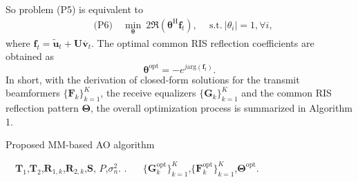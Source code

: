 \documentclass[journal]{IEEEtran}
\begin{document}
{ So problem (P5) is equivalent to 
 \begin{equation}\begin{aligned}& \text {(P6)}\quad \underset { \boldsymbol {\theta}}{\min }~ 2{\Re}(\boldsymbol {\theta}^{\mathrm{H}}{\mathbf {f}_{t}}),
     \quad ~\text {s.t.}~
     |\theta  _{i}|=1, 
    \forall{i},
     \end{aligned}\end{equation} 
    where ${\mathbf {f}_{t}}=\tilde{\mathbf {u}}_{t}+\mathbf {U}\overline{\mathbf {v}}_{t}$. The optimal common RIS reflection coefficients are obtained as 
    \begin{equation} \boldsymbol {\theta}^{\mathrm{ opt}}=-e^{ j\text {arg}(\mathbf {f}_{t})}.
\label{24}        \end{equation}
In short, with the derivation of closed-form solutions for the transmit beamformers $\{ {\mathbf{F}}_{k} \}_{k=1}^{K}$, the receive equalizers $\{ {\mathbf{G}}_{k} \}_{k=1}^{K}$ and
the common RIS reflection pattern $\boldsymbol {\Theta }$, the overall optimization process is summarized in Algorithm 1.

 \renewcommand{\algorithmicrequire}{ \textbf{Input:}} %
\renewcommand{\algorithmicensure}{ \textbf{Output :}} %


    \begin{algorithm}[htb]
    \caption{ Proposed MM-based AO algorithm}
    \label{alg:example}
    \begin{algorithmic}[1] %
    \REQUIRE ~~$\mathbf {T}_{1}$,$\mathbf {T}_{2}$,$\mathbf {R}_{1,k}$,$\mathbf {R}_{2,k}$,$\mathbf {S}$, $P$,$\sigma _{n}^{2}$.%
    .   %
    \REPEAT 
    \ENSURE ~~ $\lbrace{\boldsymbol {G} }_{k}^{\mathrm{ opt}}\rbrace_{k=1}^{K}$,$\lbrace{\boldsymbol {F} }_{k}^{\mathrm{ opt}}\rbrace_{k=1}^{K}$,${\boldsymbol {\Theta} }^{\mathrm{ opt}}$.  %
    \end{algorithmic}
    \end{algorithm}

}
\end{document}
